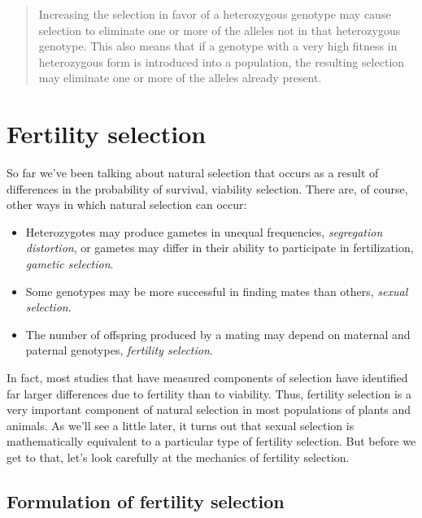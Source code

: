 \begin{quote}
Increasing the selection in favor of a heterozygous genotype may cause
selection to eliminate one or more of the alleles not in that
heterozygous genotype. This also means that if a genotype with a very
high fitness in heterozygous form is introduced into a population, the
resulting selection may eliminate one or more of the alleles already
present.
\end{quote}

\section*{Fertility selection}

So far we've been talking about natural selection that occurs as a
result of differences in the probability of survival, viability
selection. There are, of course, other ways in which natural selection
can occur:

\begin{itemize}

\item Heterozygotes may produce gametes in unequal frequencies, {\it
  segregation distortion}, or gametes may differ in their ability to
  participate in fertilization, {\it gametic selection}.

\item Some genotypes may be more successful in finding mates than
  others, {\it sexual selection}.

\item The number of offspring produced by a mating may depend on
  maternal and paternal genotypes, {\it fertility selection}.

\end{itemize}

\noindent In fact, most studies that have measured components of
selection have identified far larger differences due to fertility than
to viability. Thus, fertility selection is a very important component
of natural selection in most populations of plants and animals. As
we'll see a little later, it turns out that sexual selection is
mathematically equivalent to a particular type of fertility
selection. But before we get to that, let's look carefully at the
mechanics of fertility selection.

\subsection*{Formulation of fertility selection}

